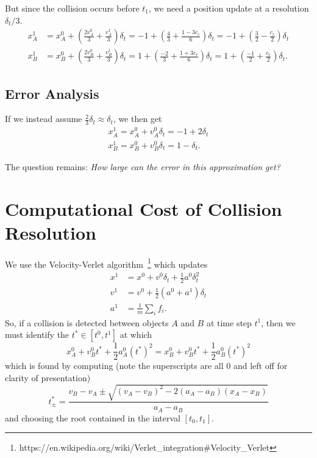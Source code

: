 \documentclass[a4paper,11pt, oneside]{article}
\begin{document}
\begin{enumerate}
But since the collision occurs before $t_1$, we need a position update at a resolution $\delta_t/3$.
\begin{align*}
    x_A^1 &= x_A^0 + \left(\frac{2v_A^0}{3} + \frac{v_A^1}{3}\right)\delta_t = -1 + \left(\frac{4}{3} + \frac{1-3c_r}{6}\right)\delta_t = -1 + \left(\frac{3}{2}-\frac{c_r}{2}\right)\delta_t\\
    x_B^1 &= x_B^0 + \left(\frac{2v_B^0}{3} + \frac{v_B^1}{3}\right)\delta_t = 1 + \left(\frac{-2}{3} + \frac{1+3c_r}{6}\right)\delta_t = 1 + \left(\frac{-1}{2}+\frac{c_r}{2}\right)\delta_t.
\end{align*}

\subsection{Error Analysis}
If we instead assume $\frac{2}{3}\delta_t \approx \delta_t$, we then get
\begin{align*}
    x_A^1 = x_A^0 + v_A^0 \delta_t = -1 + 2\delta_t\\
    x_B^1 = x_B^0 + v_B^0 \delta_t = 1 -  \delta_t.
\end{align*}

The question remains: \emph{How large can the error in this approximation get?}

\section{Computational Cost of Collision Resolution}

We use the Velocity-Verlet algorithm~\footnote{https://en.wikipedia.org/wiki/Verlet\_integration\#Velocity\_Verlet} which updates 
\begin{align*}
    x^1 &= x^0 + v^0\delta_t + \frac{1}{2} a^0\delta_t^2\\
    v^1 &= v^0 + \frac{1}{2}\left( a^0 + a^1 \right)\delta_t\\
    a^1 &= \frac{1}{m}\sum_i f_i.
\end{align*}
So, if a collision is detected between objects $A$ and $B$ at time step $t^1$, then we must identify the $t^*\in [t^0,t^1]$ at which
\[
x^0_A + v^0_Bt^* + \frac{1}{2} a_A^0\left(t^*\right)^2 = x_B^0 + v_B^0t^* + \frac{1}{2} a_B^0\left(t^*\right)^2
\]
which is found by computing (note the superscripts are all $0$ and left off for clarity of presentation)
\[
    t^*_{\pm} = \frac{v_B - v_A \pm \sqrt{(v_A - v_B)^2 - 2(a_A -  a_B)(x_A - x_B)}}{a_A - a_B}
\]
and choosing the root contained in the interval $[t_0,t_1]$.  


\end{enumerate}
\end{document}
